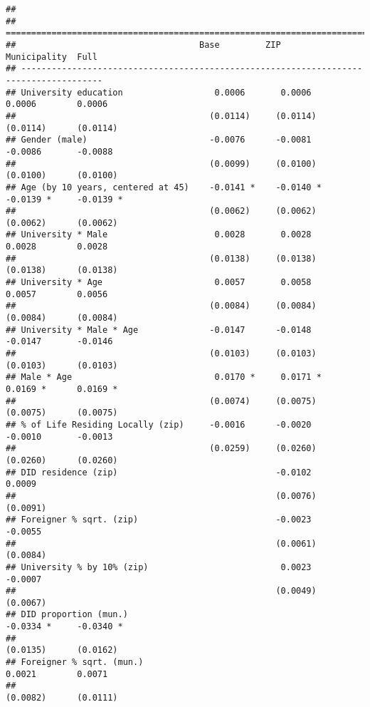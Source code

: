 \documentclass[
]{article}
\begin{document}
\begin{verbatim}
## 
## ======================================================================================
##                                    Base         ZIP          Municipality  Full       
## --------------------------------------------------------------------------------------
## University education                  0.0006       0.0006       0.0006        0.0006  
##                                      (0.0114)     (0.0114)     (0.0114)      (0.0114) 
## Gender (male)                        -0.0076      -0.0081      -0.0086       -0.0088  
##                                      (0.0099)     (0.0100)     (0.0100)      (0.0100) 
## Age (by 10 years, centered at 45)    -0.0141 *    -0.0140 *    -0.0139 *     -0.0139 *
##                                      (0.0062)     (0.0062)     (0.0062)      (0.0062) 
## University * Male                     0.0028       0.0028       0.0028        0.0028  
##                                      (0.0138)     (0.0138)     (0.0138)      (0.0138) 
## University * Age                      0.0057       0.0058       0.0057        0.0056  
##                                      (0.0084)     (0.0084)     (0.0084)      (0.0084) 
## University * Male * Age              -0.0147      -0.0148      -0.0147       -0.0146  
##                                      (0.0103)     (0.0103)     (0.0103)      (0.0103) 
## Male * Age                            0.0170 *     0.0171 *     0.0169 *      0.0169 *
##                                      (0.0074)     (0.0075)     (0.0075)      (0.0075) 
## % of Life Residing Locally (zip)     -0.0016      -0.0020      -0.0010       -0.0013  
##                                      (0.0259)     (0.0260)     (0.0260)      (0.0260) 
## DID residence (zip)                               -0.0102                     0.0009  
##                                                   (0.0076)                   (0.0091) 
## Foreigner % sqrt. (zip)                           -0.0023                    -0.0055  
##                                                   (0.0061)                   (0.0084) 
## University % by 10% (zip)                          0.0023                    -0.0007  
##                                                   (0.0049)                   (0.0067) 
## DID proportion (mun.)                                          -0.0334 *     -0.0340 *
##                                                                (0.0135)      (0.0162) 
## Foreigner % sqrt. (mun.)                                        0.0021        0.0071  
##                                                                (0.0082)      (0.0111) 

\end{verbatim}
\end{document}
